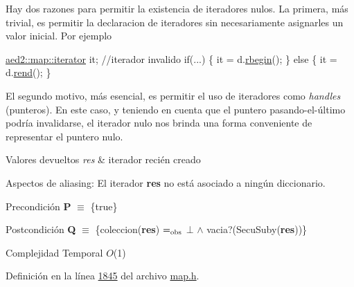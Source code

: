Hay dos razones para permitir la existencia de iteradores nulos. La primera, más trivial, es permitir la declaracion de iteradores sin necesariamente asignarles un valor inicial. Por ejemplo 
\begin{DoxyCode}
\hyperlink{classaed2_1_1map_1_1iterator}{aed2::map::iterator} it;   \textcolor{comment}{//iterador invalido}
\textcolor{keywordflow}{if}(...) \{
  it = d.\hyperlink{classaed2_1_1map_ac412d3902112122c1bffe2d4283a4e9d_ac412d3902112122c1bffe2d4283a4e9d}{rbegin}();
\} \textcolor{keywordflow}{else} \{
  it = d.\hyperlink{classaed2_1_1map_a277f03b4f4b6b98879e4e4921081801f_a277f03b4f4b6b98879e4e4921081801f}{rend}();
\}
\end{DoxyCode}
 El segundo motivo, más esencial, es permitir el uso de iteradores como {\itshape handles} (punteros). En este caso, y teniendo en cuenta que el puntero pasando-\/el-\/último podría invalidarse, el iterador nulo nos brinda una forma conveniente de representar el puntero nulo.


\begin{DoxyRetVals}{Valores devueltos}
{\em res} & iterador recién creado\\
\hline
\end{DoxyRetVals}
\begin{DoxyParagraph}{Aspectos de aliasing\+:}
El iterador {\bfseries res} no está asociado a ningún diccionario.
\end{DoxyParagraph}
\begin{DoxyPrecond}{Precondición}
{\bfseries P} $\equiv$ \{true\} 
\end{DoxyPrecond}
\begin{DoxyPostcond}{Postcondición}
{\bfseries Q} $\equiv$ \{coleccion({\bfseries res}) $=_{\rm obs}$ $\bot$ $\land$ vacia?(Secu\+Suby({\bfseries res}))\}
\end{DoxyPostcond}

\begin{DoxyDescription}
\item[Complejidad Temporal]$O$(1)
\end{DoxyDescription}

Definición en la línea \hyperlink{map_8h_source_l01845}{1845} del archivo \hyperlink{map_8h_source}{map.\+h}.

